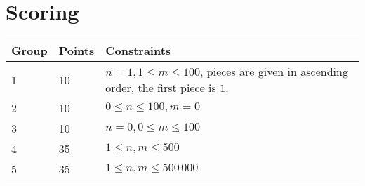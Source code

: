 \section*{Scoring}
\begin{tabular}{|l|l|l|}
\hline
Group & Points & Constraints \\ \hline
1     & 10   & $n = 1, 1 \leq m \leq 100$, pieces are given in ascending order, the first piece is $1$. \\ \hline
2     & 10   & $0 \leq n \leq 100, m = 0$ \\ \hline
3     & 10   & $n = 0, 0 \leq m \leq 100$ \\ \hline
4     & 35   & $1 \leq n, m \leq 500$\\ \hline
5     & 35   & $1 \leq n, m \leq 500\,000$ \\ \hline
\end{tabular}
